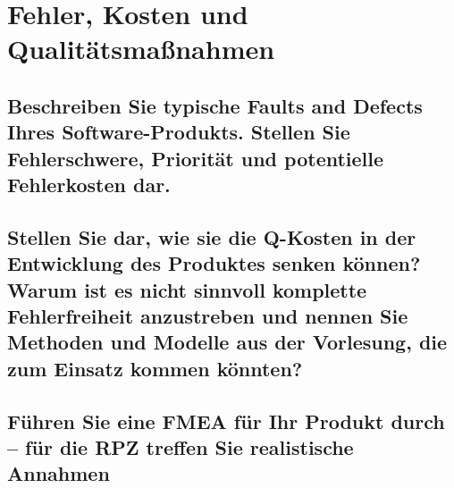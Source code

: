 \section{Fehler, Kosten und Qualitätsmaßnahmen}





\subsection{Beschreiben Sie typische Faults and Defects Ihres Software-Produkts. Stellen Sie Fehlerschwere, Priorität und potentielle Fehlerkosten dar.}





\subsection{Stellen Sie dar, wie sie die Q-Kosten in der Entwicklung des Produktes senken können? Warum ist es nicht sinnvoll komplette Fehlerfreiheit anzustreben und nennen Sie Methoden und Modelle aus der Vorlesung, die zum Einsatz kommen könnten?}







\subsection{Führen Sie eine FMEA für Ihr Produkt durch – für die RPZ treffen Sie realistische Annahmen}





